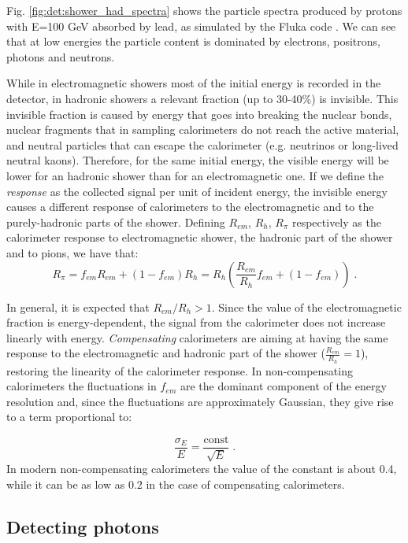 Fig. \ref{fig:det:shower_had_spectra} shows the particle spectra produced by protons with E=100 GeV absorbed by lead, as simulated by the Fluka code \cite{Ferrari:898301}. We can see that at low energies the particle content is dominated by electrons, positrons, photons and neutrons.

While in electromagnetic showers most of the initial energy is recorded in the detector, in hadronic showers a relevant fraction (up to 30-40\%) is invisible. This invisible fraction is caused by energy that goes into breaking the nuclear bonds, nuclear fragments that in sampling calorimeters do not reach the active material, and neutral particles that can escape the calorimeter (e.g. neutrinos or long-lived neutral kaons). Therefore, for the same initial energy, the visible energy will be lower for an hadronic shower than for an electromagnetic one. If we define the \textit{response} as the collected signal per unit of incident energy, the invisible energy causes a different response of calorimeters to the electromagnetic and to the purely-hadronic parts of the shower. Defining $R_{em}$, $R_{h}$, $R_{\pi}$ respectively as the calorimeter response to electromagnetic shower, the hadronic part of the shower and to pions, we have that:
\begin{equation}
R_{\pi} = f_{em}R_{em} + (1-f_{em}) R_h = R_h \left( \frac{R_{em}}{R_{h}}f_{em} + (1-f_{em})  \right) \; .
\end{equation}

In general, it is expected that $R_{em}/R_{h}>1$. Since the value of the electromagnetic fraction is energy-dependent, the signal from the calorimeter does not increase linearly with energy. \textit{Compensating} calorimeters are aiming at having the same response to the electromagnetic and hadronic part of the shower ($\frac{R_{em}}{R_{h}}=1$), restoring the linearity of the calorimeter response. In non-compensating calorimeters the fluctuations in $f_{em}$ are the dominant component of the energy resolution and, since the fluctuations are approximately Gaussian,
they give rise to a term proportional to:

\begin{equation}
\frac{\sigma_E}{E} = \frac{\mathrm{const}}{\sqrt{E}}  \; .
\end{equation}
In modern non-compensating calorimeters the value of the constant is about 0.4, while it can be as low as 0.2 in the case of compensating calorimeters.


\subsection{Detecting photons}

